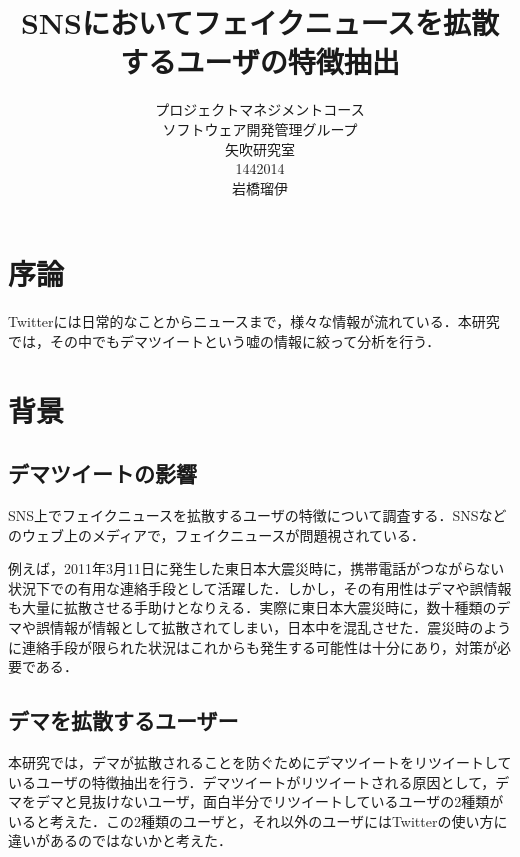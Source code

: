 \title{SNSにおいてフェイクニュースを拡散するユーザの特徴抽出}
\author{プロジェクトマネジメントコース\\
ソフトウェア開発管理グループ\\
矢吹研究室\\
1442014\\
岩橋瑠伊}
\date{}

\maketitle



\tableofcontents%

\chapter{序論}
Twitterには日常的なことからニュースまで，様々な情報が流れている．本研究では，その中でもデマツイートという嘘の情報に絞って分析を行う．

\chapter{背景}

\section{デマツイートの影響}
SNS上でフェイクニュースを拡散するユーザの特徴について調査する．SNSなどのウェブ上のメディアで，フェイクニュースが問題視されている\cite{dema1}．

例えば，2011年3月11日に発生した東日本大震災時に，携帯電話がつながらない状況下での有用な連絡手段として活躍した．しかし，その有用性はデマや誤情報も大量に拡散させる手助けとなりえる．実際に東日本大震災時に，数十種類のデマや誤情報が情報として拡散されてしまい，日本中を混乱させた．震災時のように連絡手段が限られた状況はこれからも発生する可能性は十分にあり，対策が必要である\cite{dema2}．

\section{デマを拡散するユーザー}
本研究では，デマが拡散されることを防ぐためにデマツイートをリツイートしているユーザの特徴抽出を行う．デマツイートがリツイートされる原因として，デマをデマと見抜けないユーザ，面白半分でリツイートしているユーザの2種類がいると考えた．この2種類のユーザと，それ以外のユーザにはTwitterの使い方に違いがあるのではないかと考えた．

